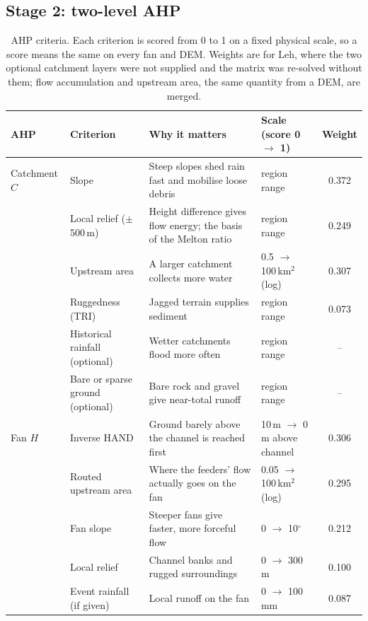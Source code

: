 \documentclass[sigconf,nonacm]{acmart}
\begin{document}
\subsection{Stage 2: two-level AHP}
\begin{table}[t]
  \caption{AHP criteria. Each criterion is scored from 0 to 1 on a fixed physical scale, so a score means the same on every fan and DEM. Weights are for Leh, where the two optional catchment layers were not supplied and the matrix was re-solved without them; flow accumulation and upstream area, the same quantity from a DEM, are merged.}
  \label{tab:ahp}
  \footnotesize
  \begin{tabular}{@{}llp{}lc@{}}
    \toprule
    AHP & Criterion & Why it matters & Scale (score 0 $\rightarrow$ 1) & Weight \\
    \midrule
    Catchment $C$ & Slope & Steep slopes shed rain fast and mobilise loose debris \cite{negi2020} & region range & 0.372 \\
     & Local relief ($\pm$500\,m) & Height difference gives flow energy; the basis of the Melton ratio \cite{wilford2004} & region range & 0.249 \\
     & Upstream area & A larger catchment collects more water & 0.5 $\rightarrow$ 100\,km$^2$ (log) & 0.307 \\
     & Ruggedness (TRI) & Jagged terrain supplies sediment \cite{riley1999} & region range & 0.073 \\
     & Historical rainfall (optional) & Wetter catchments flood more often & region range & -- \\
     & Bare or sparse ground (optional) & Bare rock and gravel give near-total runoff & region range & -- \\
    \midrule
    Fan $H$ & Inverse HAND & Ground barely above the channel is reached first \cite{nobre2011} & 10\,m $\rightarrow$ 0\,m above channel & 0.306 \\
     & Routed upstream area & Where the feeders' flow actually goes on the fan \cite{holmgren1994} & 0.05 $\rightarrow$ 100\,km$^2$ (log) & 0.295 \\
     & Fan slope & Steeper fans give faster, more forceful flow \cite{santangelo2012} & 0 $\rightarrow$ 10$^\circ$ & 0.212 \\
     & Local relief & Channel banks and rugged surroundings & 0 $\rightarrow$ 300\,m & 0.100 \\
     & Event rainfall (if given) & Local runoff on the fan & 0 $\rightarrow$ 100\,mm & 0.087 \\
    \bottomrule
  \end{tabular}
\end{table}
\end{document}

